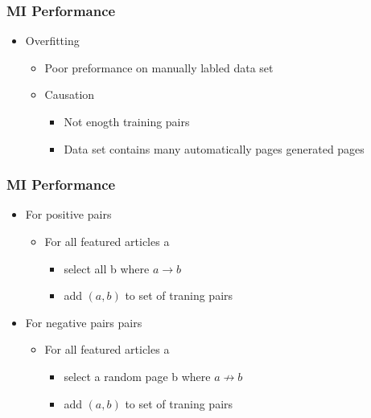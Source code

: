 \begin{frame}
    \frametitle{MI Performance}
    \begin{itemize}
      \item Overfitting
      \begin{itemize}
        \item Poor preformance on manually labled data set
        \item Causation
        \begin{itemize}
          \item Not enogth training pairs
          \item Data set contains many automatically pages generated pages
        \end{itemize}
      \end{itemize}
    \end{itemize}
\end{frame}


\begin{frame}
    \frametitle{MI Performance}
    \begin{itemize}
      \item For positive pairs
      \begin{itemize}
        \item For all featured articles a
        \begin{itemize}
          \item select all b where $a \rightarrow b$
          \item add $(a,b)$ to set of traning pairs
        \end{itemize}
      \end{itemize}
      \item For negative pairs pairs
      \begin{itemize}
        \item For all featured articles a
        \begin{itemize}
          \item select a random page b where $a \not \rightarrow b$
          \item add $(a,b)$ to set of traning pairs
        \end{itemize}
      \end{itemize}
    \end{itemize}
\end{frame}


